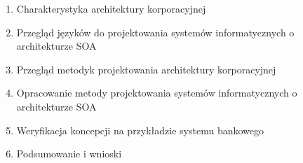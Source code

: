 \begin{enumerate}
 \item Charakterystyka architektury korporacyjnej
 \item Przegląd języków do projektowania systemów informatycznych o architekturze SOA
  \item Przegląd metodyk projektowania architektury korporacyjnej
 \item Opracowanie metody projektowania systemów informatycznych o architekturze SOA
 \item Weryfikacja koncepcji na przykładzie systemu bankowego
 \item Podsumowanie i wnioski
\end{enumerate}